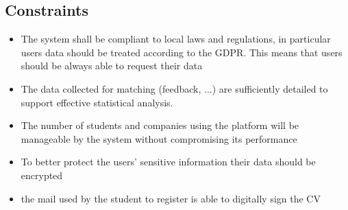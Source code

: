 		\subsection{Constraints}
			\begin{itemize}
				\item The system shall be compliant to local laws and regulations, in particular users data should be treated
				according to the GDPR. This means that users should be always able to request their data
				\item The data collected for matching (feedback, ...) are sufficiently detailed to support effective statistical analysis.
				\item The number of students and companies using the platform will be manageable by the system without compromising its performance
				\item To better protect the users’ sensitive information their data should be encrypted
				\item the mail used by the student to register is able to digitally sign the CV
			\end{itemize}
		
